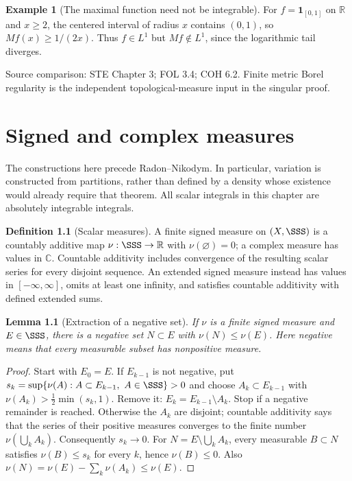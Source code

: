 \documentclass[11pt,oneside,openany]{book}
\newtheorem{lemma}[theorem]{Lemma}
\theoremstyle{definition}
\newtheorem{definition}[theorem]{Definition}
\newtheorem{example}[theorem]{Example}
\theoremstyle{remark}
\newcommand{\R}{\mathbb R}\newcommand{\C}{\mathbb C}
\newcommand{\one}{\mathbf1}\newcommand{\ind}[1]{\mathbf1_{#1}}
\newcommand{\family}[1]{}
\newcommand{\source}[1]{\par\begingroup\small\sffamily\color{black!65}Source comparison: #1\par\endgroup}
\begin{document}
\begin{example}[The maximal function need not be integrable]\family{D11.13.maximal_not_l1}\label{d11:13:maximal-not-l1}
For $f=\one_{[0,1]}$ on $\R$ and $x\geq2$, the centered interval of
radius $x$ contains $(0,1)$, so $Mf(x)\geq1/(2x)$.
Thus $f\in L^1$ but $Mf\notin L^1$, since the logarithmic tail diverges.
\end{example}
\source{STE Chapter 3; FOL 3.4; COH 6.2. Finite metric Borel regularity is the independent topological-measure input in the singular proof.}



\chapter{Signed and complex measures}\label{ch:d11-14}

The constructions here precede Radon--Nikodym. In particular, variation is
constructed from partitions, rather than defined by a density whose existence
would already require that theorem. All scalar integrals in this chapter are
absolutely integrable integrals.

\begin{definition}[Scalar measures]\family{D11.14.signed_complex_definition}\label{d11:14:signed-complex-definition}
A finite signed measure on $(X,\SSS)$ is a countably additive map
$\nu:\SSS\to\R$ with $\nu(\varnothing)=0$; a complex measure has values in
$\C$. Countable additivity includes convergence of the resulting scalar series
for every disjoint sequence. An extended signed measure instead has values in
$[-\infty,\infty]$, omits at least one infinity, and satisfies countable
additivity with defined extended sums.
\end{definition}

\begin{lemma}[Extraction of a negative set]\label{d11:14:negative-extraction}
If $\nu$ is a finite signed measure and $E\in\SSS$, there is a negative set
$N\subset E$ with $\nu(N)\leq\nu(E)$. Here negative means that every
measurable subset has nonpositive measure.
\end{lemma}
\begin{proof}
Start with $E_0=E$. If $E_{k-1}$ is not negative, put
$s_k=\sup\{\nu(A):A\subset E_{k-1},\ A\in\SSS\}>0$ and choose
$A_k\subset E_{k-1}$ with
$\nu(A_k)>\frac12\min(s_k,1)$. Remove it: $E_k=E_{k-1}\setminus A_k$.
Stop if a negative remainder is reached. Otherwise the $A_k$ are disjoint;
countable additivity says that the series of their positive measures converges
to the finite number $\nu(\bigcup_k A_k)$. Consequently $s_k\to0$.
For $N=E\setminus\bigcup_k A_k$, every measurable $B\subset N$ satisfies
$\nu(B)\leq s_k$ for every $k$, hence $\nu(B)\leq0$.
Also $\nu(N)=\nu(E)-\sum_k\nu(A_k)\leq\nu(E)$.
\end{proof}
\end{document}

